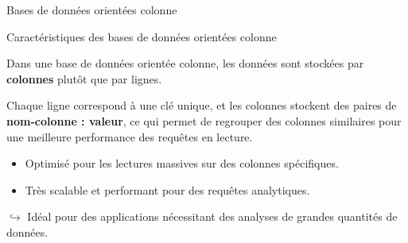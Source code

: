 \begin{frame}[standout]

    Bases de données orientées colonne


\end{frame}

\begin{frame}{Caractéristiques des bases de données orientées colonne}

    \begin{definitionbox}
        Dans une base de données orientée colonne, les données sont stockées par
        \textbf{colonnes} plutôt que par lignes.

        Chaque ligne correspond à une clé unique, et les colonnes stockent des
        paires de \textbf{nom-colonne : valeur}, ce qui permet de regrouper des
        colonnes similaires pour une meilleure performance des requêtes en
        lecture.
    \end{definitionbox}

    \begin{noteblock}
        \begin{itemize}
            \item Optimisé pour les lectures massives sur des colonnes
                  spécifiques.
            \item Très scalable et performant pour des requêtes analytiques.
        \end{itemize}
        $\hookrightarrow$ Idéal pour des applications nécessitant des analyses
        de grandes quantités de données.
    \end{noteblock}

\end{frame}

